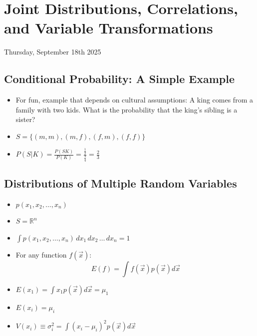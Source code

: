 \section{Joint Distributions, Correlations, and Variable Transformations}

Thursday, September 18th 2025

\subsection{Conditional Probability: A Simple Example}
\begin{itemize}
    \item For fun, example that depends on cultural assumptions: A king comes from a family with two kids. What is the probability that the king's sibling is a sister?
    \item $S  = \{ (m,m), (m,f), (f,m), (f,f) \}$
    \item $P(S|K) = \frac{P(SK)}{P(K)} = \frac{\frac{1}{2}}{\frac{3}{4}} = \frac{2}{3}$
\end{itemize}

\subsection{Distributions of Multiple Random Variables}
\begin{itemize}
    \item $p(x_1, x_2, \ldots, x_n) $
    \item $S = \mathbb{R}^n$
    \item $\int p(x_1, x_2, \ldots, x_n) \, dx_1 \, dx_2 \, \ldots \, dx_n = 1$
    \item For any function $f(\vec{x})$:
          \[ E(f) = \int f(\vec{x}) p(\vec{x}) d \vec{x} \]
    \item $E(x_1) = \int x_1 p(\vec{x}) d \vec{x} = \mu_1$
    \item $E(x_i) = \mu_i$
    \item $V(x_i) \equiv \sigma_i^2 = \int (x_i - \mu_i)^2 p(\vec{x}) d \vec{x}$
\end{itemize}

